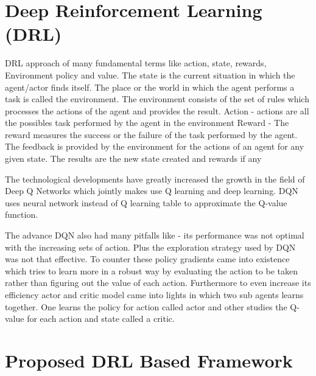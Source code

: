 \section{Deep Reinforcement Learning (DRL)}
\label{sec:relwork}
DRL approach of many fundamental terms like action, state, rewards, Environment policy and value. The state is the current situation in which the agent/actor finds itself. The place or the world in which the agent performs a task is called the environment. The environment consists of the set of rules which processes the actions of the agent and provides the result.
Action - actions are all the possibles task performed by the agent in the environment
Reward - The reward measures the success or the failure of the task performed by the agent. The feedback is provided by the environment for the actions of an agent for any given state. The results are the new state created and rewards if any  

The technological developments have greatly increased the growth in the field of Deep Q Networks which jointly makes use Q learning and deep learning. DQN uses neural network instead of Q learning table to approximate the Q-value function.  

The advance DQN \cite{mnih2015humanlevel} also had many pitfalls like - its performance was not optimal with the increasing sets of action. Plus the exploration strategy used by DQN was not that effective. To counter these policy gradients came into existence which tries to learn more in a robust way by evaluating the action to be taken rather than figuring out the value of each action. Furthermore to even increase its efficiency actor and critic model came into lights in which two sub agents learns together. One learns the policy for action called actor and other studies the Q-value for each action and state called a critic.

\section{Proposed DRL Based Framework}
\label{sec:Proposed_DRL}

